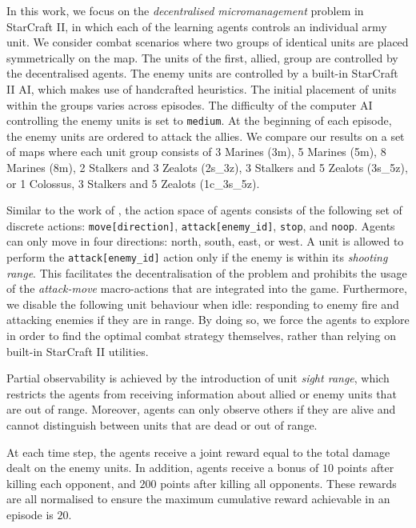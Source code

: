 \documentclass{article}
\begin{document}
In this work, we focus on the \textit{decentralised micromanagement} problem in StarCraft II, in which each of the learning agents controls an individual army unit. 
We consider combat scenarios where two groups of identical units are placed symmetrically on the map. 
The units of the first, allied, group are controlled by the decentralised agents.  
The enemy units are controlled by a built-in StarCraft II AI, which makes use of handcrafted heuristics. 
The initial placement of units within the groups varies across episodes.  
The difficulty of the computer AI controlling the enemy units is set to \texttt{medium}.
At the beginning of each episode, the enemy units are ordered to attack the allies.
We compare our results on a set of maps where each unit group consists of 3 Marines (3m), 5 Marines (5m), 8 Marines (8m), 2 Stalkers and 3 Zealots (2s\_3z), 3 Stalkers and 5 Zealots (3s\_5z), or 1 Colossus, 3 Stalkers and 5 Zealots (1c\_3s\_5z).

Similar to the work of \citet{foerster_counterfactual_2017}, the action space of agents consists of the following set of discrete actions: \texttt{move[direction]}, \texttt{attack[enemy\_id]}, \texttt{stop}, and
\texttt{noop}. 
Agents can only move in four directions: north, south, east, or west.
A unit is allowed to perform the \texttt{attack[enemy\_id]} action only if the 
enemy is within its \textit{shooting range}. 
This facilitates the decentralisation of the problem and prohibits the usage of the \emph{attack-move} macro-actions that are integrated into the game. 
Furthermore, we disable the following unit behaviour when idle: responding to enemy fire and attacking enemies if they are in range. 
By doing so, we force the agents to explore in order to find the optimal combat strategy themselves, rather than relying on built-in StarCraft II utilities.

Partial observability is achieved by the introduction of unit \textit{sight range}, which restricts the agents from receiving information about allied or enemy units that are out of range. 
Moreover, agents can only observe others if they are alive and cannot distinguish between units that are dead or out of range.



At each time step, the agents receive a joint reward equal to the total damage dealt on the enemy units. 
In addition, agents receive a bonus of $10$ points after killing each opponent, and $200$ points after killing all opponents. These rewards are all normalised to ensure the maximum cumulative reward achievable in an episode is $20$.
\end{document}
